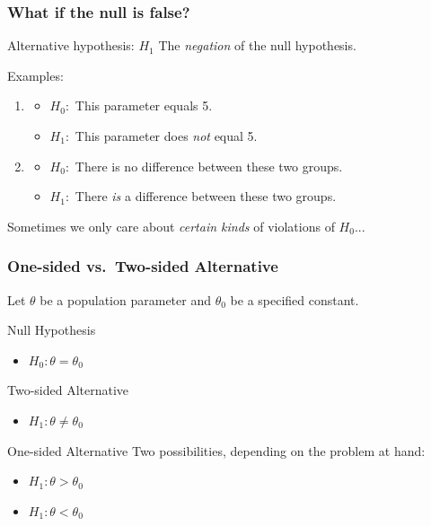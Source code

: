 \documentclass[handout]{beamer}
\begin{document}
\begin{frame}
	\frametitle{What if the null is false?}

	\begin{block}
		{Alternative hypothesis: $H_1$}
		The \emph{negation} of the null hypothesis.
	\end{block}
	\begin{block}
		{Examples:}
		\begin{enumerate}
			\item 
				\begin{itemize}
					\item $H_0\colon$ This parameter equals 5.
				\item $H_1\colon$ This parameter does \emph{not} equal 5.
		\end{itemize}
			\item 
				\begin{itemize}
					\item $H_0\colon$ There is no difference between these two groups.
					\item $H_1\colon$ There \emph{is} a difference between these two groups.
				\end{itemize}
		\end{enumerate}
		
	\end{block}

	\alert{Sometimes we only care about \emph{certain kinds} of violations of $H_0$...}
\end{frame}
\begin{frame}
\frametitle{One-sided vs.\ Two-sided Alternative}
\alert{Let $\theta$ be a population parameter and $\theta_0$ be a specified constant.}
\begin{block}
	{Null Hypothesis}
\begin{itemize}
	\item $H_0\colon \theta = \theta_0$
\end{itemize}\end{block}
	\begin{block}{Two-sided Alternative}
		\begin{itemize}
			\item $H_1\colon \theta \neq \theta_0$
		\end{itemize}
\end{block}
	\begin{block}{One-sided Alternative}
		Two possibilities, depending on the problem at hand:
		\begin{itemize}
			\item $H_1\colon \theta > \theta_0$
			\item $H_1\colon \theta < \theta_0$
		\end{itemize}
\end{block}
\end{frame}
\end{document}
